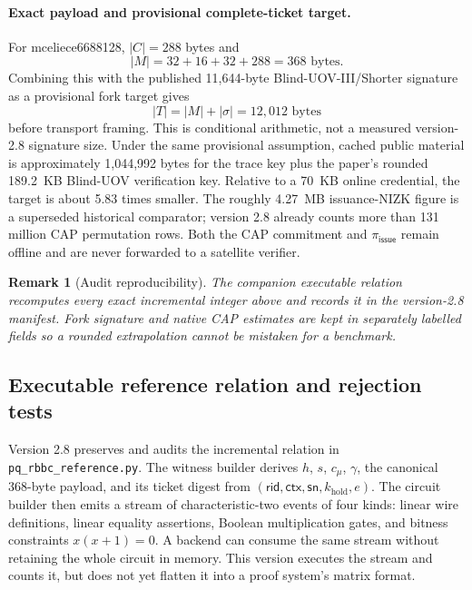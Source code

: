 \documentclass[11pt]{article}
\newtheorem{remark}[definition]{Remark}
\newcommand{\rid}{\mathsf{rid}}
\newcommand{\sn}{\mathsf{sn}}
\newcommand{\ctx}{\mathsf{ctx}}
\begin{document}
\paragraph{Exact payload and provisional complete-ticket target.}
For mceliece6688128, $|C|=288$ bytes and
\[
 |M|=32+16+32+288=368\text{ bytes}.
\]
Combining this with the published 11,644-byte Blind-UOV-III/Shorter signature
as a provisional fork target gives
\[
 |T|=|M|+|\sigma|=12{,}012\text{ bytes}
\]
before transport framing.  This is conditional arithmetic, not a measured
version-2.8 signature size.  Under the same provisional assumption, cached
public material is approximately
1,044,992 bytes for the trace key plus the paper's rounded 189.2~KB Blind-UOV
verification key.  Relative to a 70~KB online credential,
the target is about 5.83 times smaller.  The roughly 4.27~MB issuance-NIZK
figure is a superseded historical comparator; version 2.8 already counts more
than 131 million CAP permutation rows.  Both the CAP commitment and
$\pi_{\mathsf{issue}}$ remain offline and are never forwarded to a satellite
verifier.

\begin{remark}[Audit reproducibility]
The companion executable relation recomputes every exact incremental integer
above and records it in the version-2.8 manifest.  Fork signature and native
CAP estimates
are kept in separately labelled fields so a rounded extrapolation cannot be
mistaken for a benchmark.
\end{remark}

\subsection{Executable reference relation and rejection tests}
\label{sec:executable-relation}

Version 2.8 preserves and audits the incremental relation in
\texttt{pq\_rbbc\_reference.py}.  The witness builder derives
$h$, $s$, $c_\mu$, $\gamma$, the canonical 368-byte payload, and its ticket
digest from $(\rid,\ctx,\sn,k_{\mathrm{hold}},e)$.  The circuit builder then
emits a stream of characteristic-two events of four kinds: linear wire
definitions, linear equality assertions, Boolean multiplication gates, and
bitness constraints $x(x+1)=0$.  A backend can consume the same stream without
retaining the whole circuit in memory.  This version executes the stream and
counts it, but does not yet flatten it into a proof system's matrix format.
\end{document}
